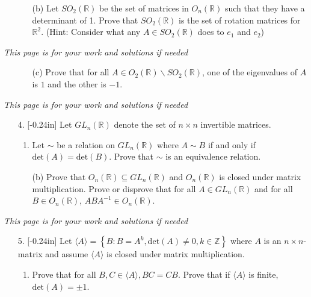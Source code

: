 \documentclass[letterpaper,12pt]{article}
\newcommand{\set}[1]{\left\{ #1 \right\}}
\theoremstyle{definition}
\begin{document}
\pagebreak
\begin{enumerate}
    \item[] \begin{enumerate}
        \item[(b)] Let $SO_2(\mathbb{R})$ be the set of matrices in $ O_n(\mathbb{R})$ such that they have a determinant of 1. Prove that $SO_2(\mathbb{R})$ is the set of rotation matrices for $\mathbb{R}^2$. (Hint: Consider what any $A \in SO_2(\mathbb{R})$ does to $e_1$ and $e_2$)
    \end{enumerate}
\end{enumerate}
\pagebreak
\textit{This page is for your work and solutions if needed}
\pagebreak
\begin{enumerate}
    \item[] \begin{enumerate}
        \item[(c)] Prove that for all $A \in O_2(\mathbb{R}) \backslash SO_2(\mathbb{R})$, one of the eigenvalues of $A$ is $1$ and the other is $-1$.
    \end{enumerate}
\end{enumerate}
\pagebreak
\textit{This page is for your work and solutions if needed}
\pagebreak
\begin{enumerate}
    \item[4.] \reversemarginpar{}[-0.24in] Let $GL_n(\mathbb{R})$ denote the set of $n \times n$ invertible matrices. \begin{enumerate}
        \item Let $\sim$ be a relation on $GL_n(\mathbb{R})$ where $A \sim B$ if and only if $\mathrm{det}(A) = \mathrm{det}(B)$.  
 Prove that $\sim$ is an equivalence relation.
    \end{enumerate}
\end{enumerate}
\pagebreak
\begin{enumerate}
    \item[] \begin{enumerate}
        \item[(b)] Prove that $O_n(\mathbb{R}) \subseteq GL_n(\mathbb{R})$ and $O_n(\mathbb{R})$ is closed under matrix multiplication. Prove or disprove that for all $A \in GL_n(\mathbb{R})$ and for all $B \in O_n(\mathbb{R})$, $ABA^{-1} \in O_n(\mathbb{R})$.
    \end{enumerate}
\end{enumerate}
    \pagebreak
\textit{This page is for your work and solutions if needed}
\pagebreak
\begin{enumerate}
    \item[5.] \reversemarginpar{}[-0.24in] Let $\langle A\rangle = \set{B : B = A^k, \mathrm{det}(A) \neq 0, k \in \mathbb{Z}}$ where $A$ is an $n\times n$-matrix and assume $\langle A \rangle $ is closed under matrix multiplication. \begin{enumerate}
        \item Prove that for all $B,C \in \langle A\rangle, BC = CB$. Prove that if $\langle A \rangle$ is finite, $\mathrm{det}(A)=\pm 1$.
    \end{enumerate}
\end{enumerate}
\end{document}
